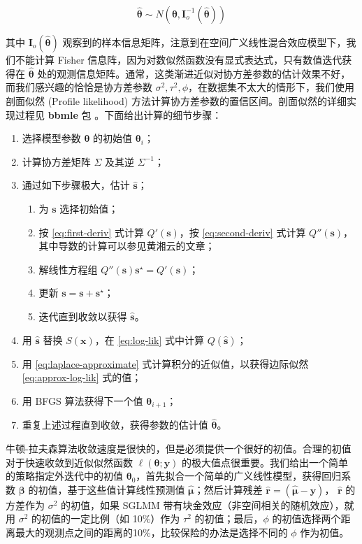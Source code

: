 \documentclass[12pt,a4paper,UTF8,twoside]{book}
\providecommand{\tightlist}{%
  \setlength{\itemsep}{0pt}\setlength{\parskip}{0pt}}
\theoremstyle{definition}
\theoremstyle{definition}
\theoremstyle{definition}
\theoremstyle{remark}
\begin{document}
\[
\hat{\boldsymbol{\theta}} \sim N(\boldsymbol{\theta}, \mathbf{I}_{o}^{-1}(\hat{\boldsymbol{\theta}}))
\]

其中 \(\mathbf{I}_{o}(\hat{\boldsymbol{\theta}})\)
观察到的样本信息矩阵，注意到在空间广义线性混合效应模型下，我们不能计算
Fisher 信息阵，因为对数似然函数没有显式表达式，只有数值迭代获得在
\(\hat{\boldsymbol{\theta}}\)
处的观测信息矩阵。通常，这类渐进近似对协方差参数的估计效果不好，而我们感兴趣的恰恰是协方差参数
\(\sigma^2,\tau^2,\phi\)，在数据集不太大的情形下，我们使用剖面似然
(Profile likelihood)
方法计算协方差参数的置信区间。剖面似然的详细实现过程见 \textbf{bbmle} 包
\citep{R-bbmle}。下面给出计算的细节步骤：

\begin{enumerate}
\def\labelenumi{\arabic{enumi}.}
\tightlist
\item
  选择模型参数 \(\boldsymbol{\theta}\) 的初始值
  \(\boldsymbol{\theta}_{i}\)；
\item
  计算协方差矩阵 \(\Sigma\) 及其逆 \(\Sigma^{-1}\)；
\item
  通过如下步骤极大，估计 \(\hat{\mathbf{s}}\)；

  \begin{enumerate}
  \def\labelenumii{(\alph{enumii})}
  \tightlist
  \item
    为 \(\mathbf{s}\) 选择初始值；
  \item
    按 \eqref{eq:first-deriv} 式计算 \(Q'(\mathbf{s})\)，按
    \eqref{eq:second-deriv} 式计算
    \(Q''(\mathbf{s})\)，其中导数的计算可以参见黄湘云的文章\citep{Huang2016COS}；
  \item
    解线性方程组
    \(Q''(\mathbf{s})\mathbf{s}^{\star} = Q'(\mathbf{s})\)；
  \item
    更新 \(\mathbf{s = s + s^{\star}}\)；
  \item
    迭代直到收敛以获得 \(\hat{\mathbf{s}}\)。
  \end{enumerate}
\item
  用 \(\hat{\mathbf{s}}\) 替换 \(S(\mathbf{x})\)，在 \eqref{eq:log-lik}
  式中计算 \(Q(\hat{\mathbf{s}})\)；
\item
  用 \eqref{eq:laplace-approximate} 式计算积分的近似值，以获得边际似然
  \eqref{eq:approx-log-lik} 式的值；
\item
  用 BFGS 算法获得下一个值 \(\boldsymbol{\theta}_{i+1}\)；
\item
  重复上述过程直到收敛，获得参数的估计值 \(\hat{\boldsymbol{\theta}}\)。
\end{enumerate}

牛顿-拉夫森算法收敛速度是很快的，但是必须提供一个很好的初值。合理的初值对于快速收敛到近似似然函数
\(\ell(\boldsymbol{\theta};\mathbf{y})\)
的极大值点很重要。我们给出一个简单的策略指定外迭代中的初值
\(\boldsymbol{\theta}_{0}\)，首先拟合一个简单的广义线性模型，获得回归系数
\(\boldsymbol{\beta}\) 的初值，基于这些值计算线性预测值
\(\hat{\boldsymbol{\mu}}\)；然后计算残差
\(\hat{\boldsymbol{r}} = (\hat{\boldsymbol{\mu}} - \mathbf{y})\)，
\(\hat{\boldsymbol{r}}\) 的方差作为 \(\sigma^2\) 的初值，如果 SGLMM
带有块金效应（非空间相关的随机效应），就用 \(\sigma^2\)
的初值的一定比例（如 10\%）作为 \(\tau^2\) 的初值；最后，\(\phi\)
的初值选择两个距离最大的观测点之间的距离的10\%，比较保险的办法是选择不同的
\(\phi\) 作为初值。
\end{document}
